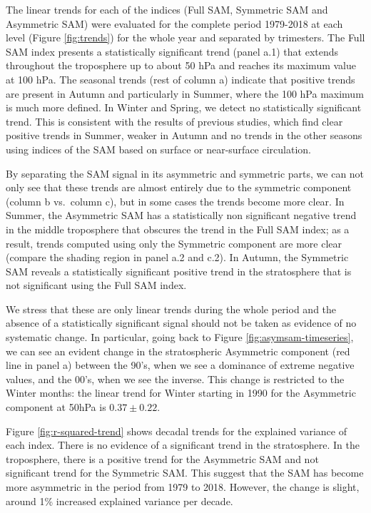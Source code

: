 \documentclass[]{ametsocV5}
\begin{document}
The linear trends for each of the indices (Full SAM, Symmetric SAM and
Asymmetric SAM) were evaluated for the complete period 1979-2018 at each
level (Figure \ref{fig:trends}) for the whole year and separated by
trimesters. The Full SAM index presents a statistically significant
trend (panel a.1) that extends throughout the troposphere up to about 50
hPa and reaches its maximum value at 100 hPa. The seasonal trends (rest
of column a) indicate that positive trends are present in Autumn and
particularly in Summer, where the 100 hPa maximum is much more defined.
In Winter and Spring, we detect no statistically significant trend. This
is consistent with the results of previous studies, which find clear
positive trends in Summer, weaker in Autumn and no trends in the other
seasons \citep[e.g.][ and references therein]{fogt2020} using indices of
the SAM based on surface or near-surface circulation.

By separating the SAM signal in its asymmetric and symmetric parts, we
can not only see that these trends are almost entirely due to the
symmetric component (column b vs.~column c), but in some cases the
trends become more clear. In Summer, the Asymmetric SAM has a
statistically non significant negative trend in the middle troposphere
that obscures the trend in the Full SAM index; as a result, trends
computed using only the Symmetric component are more clear (compare the
shading region in panel a.2 and c.2). In Autumn, the Symmetric SAM
reveals a statistically significant positive trend in the stratosphere
that is not significant using the Full SAM index.

We stress that these are only linear trends during the whole period and
the absence of a statistically significant signal should not be taken as
evidence of no systematic change. In particular, going back to Figure
\ref{fig:asymsam-timeseries}, we can see an evident change in the
stratospheric Asymmetric component (red line in panel a) between the
90's, when we see a dominance of extreme negative values, and the 00's,
when we see the inverse. This change is restricted to the Winter months:
the linear trend for Winter starting in 1990 for the Asymmetric
component at 50hPa is \(0.37 \pm 0.22\).

Figure \ref{fig:r-squared-trend} shows decadal trends for the explained
variance of each index. There is no evidence of a significant trend in
the stratosphere. In the troposphere, there is a positive trend for the
Asymmetric SAM and not significant trend for the Symmetric SAM. This
suggest that the SAM has become more asymmetric in the period from 1979
to 2018. However, the change is slight, around 1\% increased explained
variance per decade.
\end{document}
